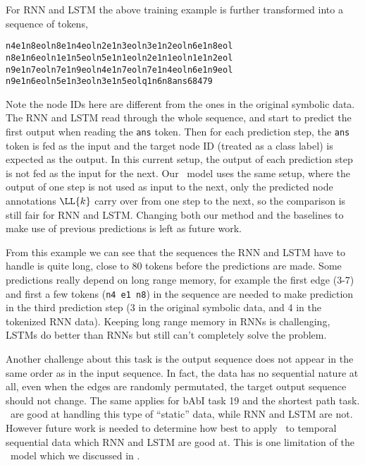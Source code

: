 For RNN and LSTM the above training example is further transformed into a
sequence of tokens,
\begin{framed}
\begin{alltt}
n4 e1 n8 eol n8 e1 n4 eol n2 e1 n3 eol n3 e1 n2 eol n6 e1 n8 eol
n8 e1 n6 eol n1 e1 n5 eol n5 e1 n1 eol n2 e1 n1 eol n1 e1 n2 eol
n9 e1 n7 eol n7 e1 n9 eol n4 e1 n7 eol n7 e1 n4 eol n6 e1 n9 eol
n9 e1 n6 eol n5 e1 n3 eol n3 e1 n5 eol q1 n6 n8 ans 6 8 4 7 9
\end{alltt}
\end{framed}
Note the node IDs here are different from the ones in the original symbolic
data. The RNN and LSTM read through the whole sequence, and start to predict
the first output when reading the \texttt{ans} token.  Then for each
prediction step, the \texttt{ans} token is fed as the input and the target
node ID (treated as a class label) is expected as the output.  In this
current setup, the output of each prediction step is not fed as the input for
the next. Our \OurMethodShort~model uses the same setup, where the output
of one step is not used as input to the next, only the predicted node
annotations $\LL{k}$ carry over from one step to the next, so the
comparison is still fair for RNN and LSTM.  Changing both our method and the
baselines to make use of previous predictions is left as future work.

From this example we can see that the sequences the RNN and LSTM have to
handle is quite long, close to 80 tokens before the predictions are made. Some
predictions really depend on long range memory, for example the first edge
(3-7) and first a few tokens (\texttt{n4 e1 n8}) in the sequence are needed to
make prediction in the third prediction step (3 in the original symbolic data,
and 4 in the tokenized RNN data). Keeping long range memory in RNNs is
challenging, LSTMs do better than RNNs but still can't completely solve the
problem.

Another challenge about this task is the output sequence does not appear in
the same order as in the input sequence.  In fact, the data has no sequential
nature at all, even when the edges are randomly permutated, the target output
sequence should not change.  The same applies for bAbI task 19 and the shortest
path task. \OurMethodShorts~are good at handling this type of ``static'' data,
while RNN and LSTM are not.  However future work is needed to determine how
best to apply \OurMethodShorts~to temporal sequential data which RNN and LSTM are good at.
This is one limitation of the \OurMethodShorts~model which we discussed in
.


